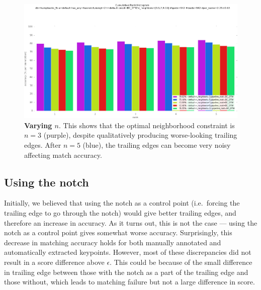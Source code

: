 \begin{figure}[t]%
\centering
\includegraphics[width=1\textwidth]{../images/results/vary_neighbors.png}
\caption{\textbf{Varying $n$}. This shows that the optimal neighborhood constraint is $n = 3$ (purple), despite qualitatively producing worse-looking trailing edges. After $n = 5$ (blue), the trailing edges can become very noisy affecting match accuracy.}
\label{fig:vary_neighbors}
\end{figure}

\subsection{Using the notch}

Initially, we believed that using the notch as a control point (i.e.\ forcing the trailing edge to go through the notch) would give better trailing edges, and therefore an increase in accuracy.
As it turns out, this is not the case --- using the notch as a control point gives somewhat worse accuracy.
Surprisingly, this decrease in matching accuracy holds for both manually annotated and automatically extracted keypoints.
However, most of these discrepancies did not result in a score difference above $\epsilon$.
This could be because of the small difference in trailing edge between those with the notch as a part of the trailing edge and those without, which leads to matching failure but not a large difference in score.


